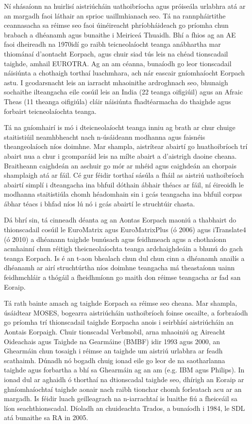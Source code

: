 \documentclass[]{../../metanetpaper}
\begin{document}
\begin{multicols}{2}

Ní shásaíonn na huirlisí aistriúcháin uathoibríocha agus próiseála urlabhra atá ar an margadh faoi láthair an sprioc uaillmhianach seo. Tá na rannpháirtithe ceannasacha sa réimse seo faoi úinéireacht phríobháideach go príomha chun brabach a dhéanamh agus bunaithe i Meiriceá Thuaidh. Bhí a fhios ag an AE faoi dheireadh na 1970idí go raibh teicneolaíocht teanga an\-ábhartha mar thiománaí d’aontacht Eorpach, agus chuir siad tús leis na chéad tionscadail taighde, amhail EUROTRA. Ag an am céanna, bunaíodh go leor tionscadail náisiúnta a chothaigh torthaí luachmhara, ach nár eascair gníomhaíocht Eorpach astu. I gcodarsnacht leis an iarracht mhaoinithe ardroghnach seo, bhunaigh sochaithe ilteangacha eile cosúil leis an India (22 teanga oifigiúil) agus an Afraic Theas (11 theanga oifigiúla) cláir náisiúnta fhadtéarmacha do thaighde agus forbairt teicneolaíochta teanga. 

Tá na gníomhairí is mó i dteicneolaíocht teanga inniu ag brath ar chur chuige staitistiúil neamhbheacht nach n-úsáideann modhanna agus faisnéis theangeolaíoch níos doimhne. Mar shampla, aistrítear abairtí go huathoibríoch trí abairt nua a chur i gcomparáid leis na mílte abairt a d’aistrigh daoine cheana. Braitheann caighdeán an aschuir go mór ar mhéid agus caighdeán an chorpais shamplaigh atá ar fáil. Cé gur féidir torthaí sásúla a fháil as aistriú uathoibríoch abairtí simplí i dteangacha ina bhfuil dóthain ábhair théacs ar fáil, ní éireoidh le modhanna staitistiúla chomh héadomhain sin i gcás teangacha ina bhfuil corpas ábhar téacs i bhfad níos lú nó i gcás abairtí le struchtúir chasta.

Dá bhrí sin, tá cinneadh déanta ag an Aontas Eorpach maoniú a thabhairt do thionscadail cosúil le EuroMatrix agus EuroMatrixPlus (ó 2006) agus iTranslate4 (ó 2010) a dhéanann taighde bunúsach agus feidhmeach agus a chothaíonn acmhainní chun réitigh theicneolaíochta teanga ardchaighdeáin a bhunú do gach teanga Eorpach. Is é an t-aon bhealach chun dul chun cinn a dhéanamh anailís a dhéanamh ar airí struchtúrtha níos doimhne teangacha má theastaíonn uainn feidhmchláir a thógáil a fheidhmíonn go maith don réimse teangacha ar fad san Eoraip.

Tá rath bainte amach ag taighde Eorpach sa réimse seo cheana. Mar shampla, úsáidtear MOSES, bogearra aistriúcháin uathoibríoch foinse oscailte, a forbraíodh go príomha trí thionscadail taighde Eorpacha anois i seirbhísí aistriúcháin an Aontais Eorpaigh. Chuir tionscadal Verbmobil, arna mhaoiniú ag Aireacht Oideachais agus Taighde na Gearmáine (BMBF) idir 1993 agus 2000, an Ghearmáin chun tosaigh i réimse an taighde um aistriú urlabhra ar feadh scathaimh. Dúnadh nó bogadh chuig ionad eile go leor de na saotharlanna taighde agus forbartha a bhí sa Ghearmáin ag an am (e.g. IBM agus Philips). In ionad dul ar aghaidh ó thorthaí na dtionscadal taighde seo, dhírigh an Eoraip ar ghníomhaíochtaí taighde aonair nach raibh tionchar chomh forleatach acu ar an margadh.  Is féidir luach geilleagrach na n-iarrachtaí is luaithe fiú a fheiceáil sa líon seachthionscadal. Díoladh an chuideachta Trados, a bunaíodh i 1984, le SDL atá bunaithe sa RA in 2005.



\end{multicols}
\end{document}

